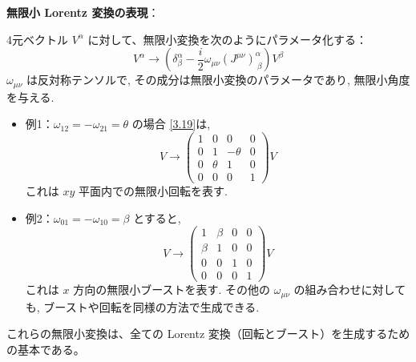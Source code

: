 \documentclass[a4paper,12pt]{article}
\begin{document}
\vspace{1em}
\textbf{無限小 Lorentz 変換の表現}：

4元ベクトル $V^\alpha$ に対して、無限小変換を次のようにパラメータ化する：
\begin{equation*}
V^\alpha \rightarrow \left( \delta^\alpha_\beta - \frac{i}{2} \omega_{\mu\nu}(J^{\mu\nu})^\alpha_{\ \beta} \right)V^\beta \label{3.19}\tag{3.19}
\end{equation*}
$\omega_{\mu\nu}$ は反対称テンソルで, その成分は無限小変換のパラメータであり, 無限小角度を与える.
\begin{itemize}
  \item 例1：$\omega_{12} = -\omega_{21} = \theta$ の場合 \eqref{3.19}は,
  \begin{equation*}
  V \rightarrow 
  \begin{pmatrix}
  1 & 0 & 0 & 0 \\
  0 & 1 & -\theta & 0 \\
  0 & \theta & 1 & 0 \\
  0 & 0 & 0 & 1
  \end{pmatrix}
  V \tag{3.20}
  \end{equation*}
  これは $xy$ 平面内での無限小回転を表す.

  \item 例2：$\omega_{01} = -\omega_{10} = \beta$ とすると,
  \begin{equation*}
  V \rightarrow 
  \begin{pmatrix}
  1 & \beta & 0 & 0 \\
  \beta & 1 & 0 & 0 \\
  0 & 0 & 1 & 0 \\
  0 & 0 & 0 & 1
  \end{pmatrix}
  V \tag{3.21}
  \end{equation*}
  これは $x$ 方向の無限小ブーストを表す. その他の $\omega_{\mu\nu}$ の組み合わせに対しても, ブーストや回転を同様の方法で生成できる.
\end{itemize}

これらの無限小変換は、全ての Lorentz 変換（回転とブースト）を生成するための基本である。
\end{document}
